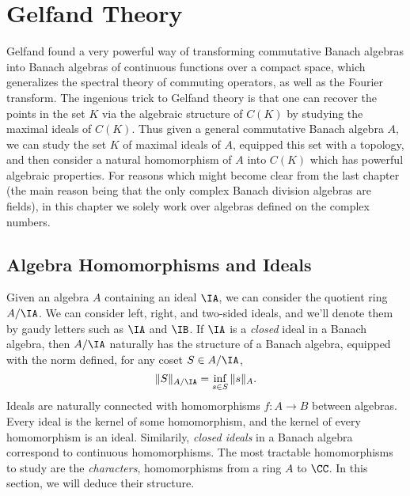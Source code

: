 \chapter{Gelfand Theory}

Gelfand found a very powerful way of transforming commutative Banach algebras into Banach algebras of continuous functions over a compact space, which generalizes the spectral theory of commuting operators, as well as the Fourier transform. The ingenious trick to Gelfand theory is that one can recover the points in the set $K$ via the algebraic structure of $C(K)$ by studying the maximal ideals of $C(K)$. Thus given a general commutative Banach algebra $A$, we can study the set $K$ of maximal ideals of $A$, equipped this set with a topology, and then consider a natural homomorphism of $A$ into $C(K)$ which has powerful algebraic properties. For reasons which might become clear from the last chapter (the main reason being that the only complex Banach division algebras are fields), in this chapter we solely work over algebras defined on the complex numbers.

\section{Algebra Homomorphisms and Ideals}

Given an algebra $A$ containing an ideal $\IA$, we can consider the quotient ring $A/ \IA$. We can consider left, right, and two-sided ideals, and we'll denote them by gaudy letters such as $\IA$ and $\IB$. If $\IA$ is a \emph{closed} ideal in a Banach algebra, then $A/ \IA$ naturally has the structure of a Banach algebra, equipped with the norm defined, for any coset $S \in A/\IA$,
%
\[ \| S \|_{A/\IA} = \inf_{s \in S} \| s \|_A. \]
Ideals are naturally connected with homomorphisms $f: A \to B$ between algebras. Every ideal is the kernel of some homomorphism, and the kernel of every homomorphism is an ideal. Similarily, \emph{closed ideals} in a Banach algebra correspond to continuous homomorphisms. The most tractable homomorphisms to study are the \emph{characters}, homomorphisms from a ring $A$ to $\CC$. In this section, we will deduce their structure.

